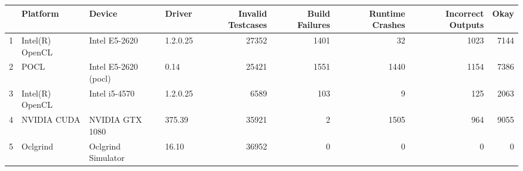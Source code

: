 \begin{tabular}{llllrrrrr}
\toprule
{} &         Platform &                Device &    Driver &  Invalid Testcases &  Build Failures &  Runtime Crashes &  Incorrect Outputs &  Okay \\
\midrule
1 &  Intel(R) OpenCL &         Intel E5-2620 &  1.2.0.25 &              27352 &            1401 &               32 &               1023 &  7144 \\
2 &             POCL &  Intel E5-2620 (pocl) &      0.14 &              25421 &            1551 &             1440 &               1154 &  7386 \\
3 &  Intel(R) OpenCL &         Intel i5-4570 &  1.2.0.25 &               6589 &             103 &                9 &                125 &  2063 \\
4 &      NVIDIA CUDA &       NVIDIA GTX 1080 &    375.39 &              35921 &               2 &             1505 &                964 &  9055 \\
5 &         Oclgrind &    Oclgrind Simulator &     16.10 &              36952 &               0 &                0 &                  0 &     0 \\
\bottomrule
\end{tabular}
